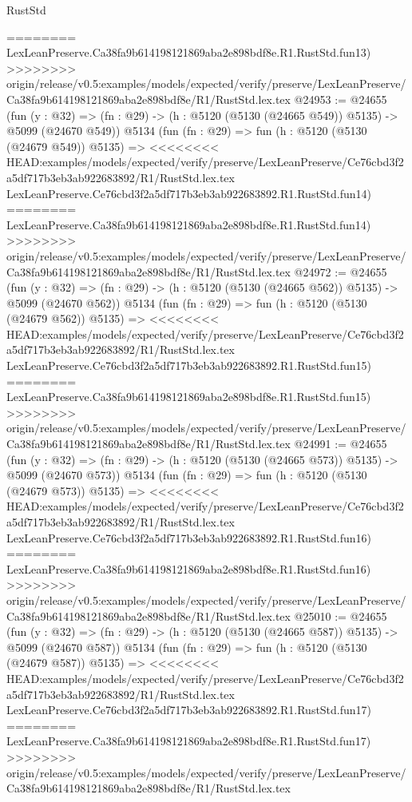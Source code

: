 \begin{lexlean}{RustStd}
\begin{coremodule}
{\begin{coremodule}
{{{{{{{{{{{{{{{{{{{{{{{{{{{{{{{========
    LexLeanPreserve.Ca38fa9b614198121869aba2e898bdf8e.R1.RustStd.fun13)
>>>>>>>> origin/release/v0.5:examples/models/expected/verify/preserve/LexLeanPreserve/Ca38fa9b614198121869aba2e898bdf8e/R1/RustStd.lex.tex
@24953 := @24655
    (fun (y : @32) => (fn : @29) -> (h : @5120 (@5130 (@24665 @549)) @5135) -> @5099 (@24670 @549))
    @5134
    (fun (fn : @29) =>
    fun (h : @5120 (@5130 (@24679 @549)) @5135) =>
<<<<<<<< HEAD:examples/models/expected/verify/preserve/LexLeanPreserve/Ce76cbd3f2a5df717b3eb3ab922683892/R1/RustStd.lex.tex
    LexLeanPreserve.Ce76cbd3f2a5df717b3eb3ab922683892.R1.RustStd.fun14)
========
    LexLeanPreserve.Ca38fa9b614198121869aba2e898bdf8e.R1.RustStd.fun14)
>>>>>>>> origin/release/v0.5:examples/models/expected/verify/preserve/LexLeanPreserve/Ca38fa9b614198121869aba2e898bdf8e/R1/RustStd.lex.tex
@24972 := @24655
    (fun (y : @32) => (fn : @29) -> (h : @5120 (@5130 (@24665 @562)) @5135) -> @5099 (@24670 @562))
    @5134
    (fun (fn : @29) =>
    fun (h : @5120 (@5130 (@24679 @562)) @5135) =>
<<<<<<<< HEAD:examples/models/expected/verify/preserve/LexLeanPreserve/Ce76cbd3f2a5df717b3eb3ab922683892/R1/RustStd.lex.tex
    LexLeanPreserve.Ce76cbd3f2a5df717b3eb3ab922683892.R1.RustStd.fun15)
========
    LexLeanPreserve.Ca38fa9b614198121869aba2e898bdf8e.R1.RustStd.fun15)
>>>>>>>> origin/release/v0.5:examples/models/expected/verify/preserve/LexLeanPreserve/Ca38fa9b614198121869aba2e898bdf8e/R1/RustStd.lex.tex
@24991 := @24655
    (fun (y : @32) => (fn : @29) -> (h : @5120 (@5130 (@24665 @573)) @5135) -> @5099 (@24670 @573))
    @5134
    (fun (fn : @29) =>
    fun (h : @5120 (@5130 (@24679 @573)) @5135) =>
<<<<<<<< HEAD:examples/models/expected/verify/preserve/LexLeanPreserve/Ce76cbd3f2a5df717b3eb3ab922683892/R1/RustStd.lex.tex
    LexLeanPreserve.Ce76cbd3f2a5df717b3eb3ab922683892.R1.RustStd.fun16)
========
    LexLeanPreserve.Ca38fa9b614198121869aba2e898bdf8e.R1.RustStd.fun16)
>>>>>>>> origin/release/v0.5:examples/models/expected/verify/preserve/LexLeanPreserve/Ca38fa9b614198121869aba2e898bdf8e/R1/RustStd.lex.tex
@25010 := @24655
    (fun (y : @32) => (fn : @29) -> (h : @5120 (@5130 (@24665 @587)) @5135) -> @5099 (@24670 @587))
    @5134
    (fun (fn : @29) =>
    fun (h : @5120 (@5130 (@24679 @587)) @5135) =>
<<<<<<<< HEAD:examples/models/expected/verify/preserve/LexLeanPreserve/Ce76cbd3f2a5df717b3eb3ab922683892/R1/RustStd.lex.tex
    LexLeanPreserve.Ce76cbd3f2a5df717b3eb3ab922683892.R1.RustStd.fun17)
========
    LexLeanPreserve.Ca38fa9b614198121869aba2e898bdf8e.R1.RustStd.fun17)
>>>>>>>> origin/release/v0.5:examples/models/expected/verify/preserve/LexLeanPreserve/Ca38fa9b614198121869aba2e898bdf8e/R1/RustStd.lex.tex
}}}}}}}}}}}}}}}}}}}}}}}}}}}}}}}
\end{coremodule}}
\end{coremodule}
\end{lexlean}
